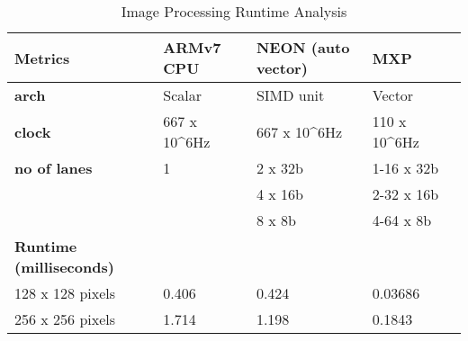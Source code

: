 \begin{table}[htbp]
	\centering
		\begin{adjustbox}{width=.9\textwidth}
		\small
	\begin{tabular}{lllll}
		\toprule
		\textbf{Metrics} & \textbf{ARMv7 CPU} & \textbf{NEON (auto vector)} & \textbf{MXP} \\
		\midrule
		\textbf{arch} & Scalar & SIMD unit & Vector \\
		\textbf{clock} & 667 x 10^{6}Hz & 667 x 10^{6}Hz & 110 x 10^{6}Hz \\
		\textbf{no of lanes} & 1 & 2 x 32b & 1-16 x 32b \\
		&   & 4 x 16b & 2-32 x 16b \\
		&   & 8 x 8b & 4-64 x 8b \\
		\midrule
	\textbf{Runtime (milliseconds)} &   &   &  \\
		\midrule
     128 x  128      pixels & 0.406 & 0.424 & 0.03686  \\	
	 256 x  256      pixels & 1.714 & 1.198 & 0.1843  \\
		\bottomrule
	\end{tabular}%
     \end{adjustbox}%
	\caption{Image Processing Runtime Analysis}
		\label{ga:100}%
\end{table}%